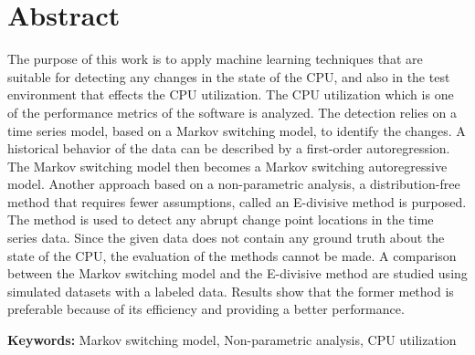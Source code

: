 
\chapter*{Abstract}


The purpose of this work is to apply machine learning techniques that
are suitable for detecting any changes in the state of the CPU, and
also in the test environment that effects the CPU utilization. The
CPU utilization which is one of the performance metrics of the software
is analyzed. The detection relies on a time series model, based on
a Markov switching model, to identify the changes. A historical behavior
of the data can be described by a first-order autoregression. The
Markov switching model then becomes a Markov switching autoregressive
model. Another approach based on a non-parametric analysis, a distribution-free
method that requires fewer assumptions, called an E-divisive method
is purposed. The method is used to detect any abrupt change point
locations in the time series data. Since the given data does not contain
any ground truth about the state of the CPU, the evaluation of the
methods cannot be made. A comparison between the Markov switching
model and the E-divisive method are studied using simulated datasets
with a labeled data. Results show that the former method is preferable
because of its efficiency and providing a better performance. 

\textbf{Keywords:} Markov switching model, Non-parametric analysis,
CPU utilization
